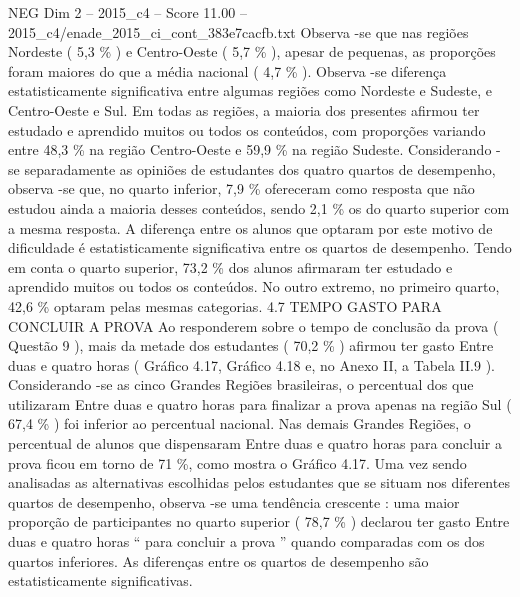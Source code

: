 \begin{textsample}{NEG Dim 2 – 2015\_c4 – Score 11.00 – 2015\_c4/enade\_2015\_ci\_cont\_383e7cacfb.txt}
Observa -se que nas regiões Nordeste ( 5,3 \% ) e Centro-Oeste ( 5,7 \% ), apesar de pequenas, as proporções foram maiores do que a média nacional ( 4,7 \% ).
Observa -se diferença estatisticamente significativa entre algumas regiões como Nordeste e Sudeste, e Centro-Oeste e Sul.
Em todas as regiões, a maioria dos presentes afirmou ter estudado e aprendido muitos ou todos os conteúdos, com proporções variando entre 48,3 \% na região Centro-Oeste e 59,9 \% na região Sudeste.
Considerando -se separadamente as opiniões de estudantes dos quatro quartos de desempenho, observa -se que, no quarto inferior, 7,9 \% ofereceram como resposta que não estudou ainda a maioria desses conteúdos, sendo 2,1 \% os do quarto superior com a mesma resposta.
A diferença entre os alunos que optaram por este motivo de dificuldade é estatisticamente significativa entre os quartos de desempenho.
Tendo em conta o quarto superior, 73,2 \% dos alunos afirmaram ter estudado e aprendido muitos ou todos os conteúdos.
No outro extremo, no primeiro quarto, 42,6 \% optaram pelas mesmas categorias. 4.7 TEMPO GASTO PARA CONCLUIR A PROVA Ao responderem sobre o tempo de conclusão da prova ( Questão 9 ), mais da metade dos estudantes ( 70,2 \% ) afirmou ter gasto Entre duas e quatro horas ( Gráfico 4.17, Gráfico 4.18 e, no Anexo II, a Tabela II.9 ).
Considerando -se as cinco Grandes Regiões brasileiras, o percentual dos que utilizaram Entre duas e quatro horas para finalizar a prova apenas na região Sul ( 67,4 \% ) foi inferior ao percentual nacional.
Nas demais Grandes Regiões, o percentual de alunos que dispensaram Entre duas e quatro horas para concluir a prova ficou em torno de 71 \%, como mostra o Gráfico 4.17.
Uma vez sendo analisadas as alternativas escolhidas pelos estudantes que se situam nos diferentes quartos de desempenho, observa -se uma tendência crescente : uma maior proporção de participantes no quarto superior ( 78,7 \% ) declarou ter gasto Entre duas e quatro horas “ para concluir a prova ” quando comparadas com os dos quartos inferiores.
As diferenças entre os quartos de desempenho são estatisticamente significativas.

\end{textsample}
